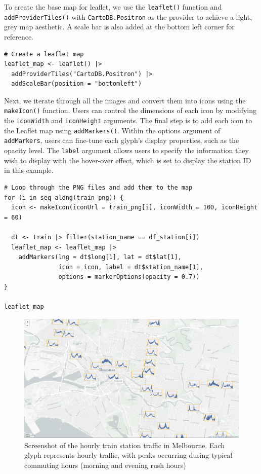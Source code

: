 To create the base map for leaflet, we use the \texttt{leaflet()} function and \texttt{addProviderTiles()} with \texttt{CartoDB.Positron} as the provider to achieve a light, grey map aesthetic. A scale bar is also added at the bottom left corner for reference.

\begin{verbatim}
# Create a leaflet map 
leaflet_map <- leaflet() |>
  addProviderTiles("CartoDB.Positron") |>
  addScaleBar(position = "bottomleft")
\end{verbatim}

Next, we iterate through all the images and convert them into icons using the \texttt{makeIcon()} function. Users can control the dimensions of each icon by modifying the \texttt{iconWidth} and \texttt{iconHeight} arguments. The final step is to add each icon to the Leaflet map using \texttt{addMarkers()}. Within the options argument of \texttt{addMarkers}, users can fine-tune each glyph's display properties, such as the opacity level. The \texttt{label} argument allows users to specify the information they wish to display with the hover-over effect, which is set to display the station ID in this example.

\begin{verbatim}
# Loop through the PNG files and add them to the map
for (i in seq_along(train_png)) {
  icon <- makeIcon(iconUrl = train_png[i], iconWidth = 100, iconHeight = 60)
  
  dt <- train |> filter(station_name == df_station[i])
  leaflet_map <- leaflet_map |>
    addMarkers(lng = dt$long[1], lat = dt$lat[1], 
               icon = icon, label = dt$station_name[1],
               options = markerOptions(opacity = 0.7))
}

leaflet_map
\end{verbatim}

\begin{figure}

{\centering \includegraphics[width=1\linewidth]{figures/leaflet} 

}

\caption{Screenshot of the hourly train station traffic in Melbourne. Each glyph represents hourly traffic, with peaks occurring during typical commuting hours (morning and evening rush hours)}\label{fig:unnamed-chunk-19}
\end{figure}

